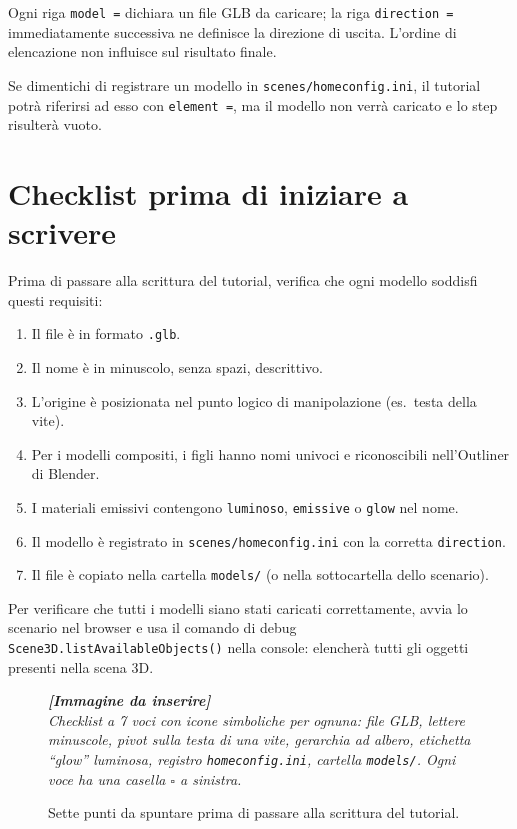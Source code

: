 ﻿\documentclass[a4paper,12pt,oneside]{book}
\newcommand{\kw}[1]{\texttt{\color{keycolor}#1}}
\newcommand{\file}[1]{\texttt{#1}}
\newcommand{\imgph}[2]{%
  \begin{tcolorbox}[colback=cvtlightblue!30,colframe=cvtblue!40,%
    width=#1,halign=center,valign=center,height=5cm,boxrule=0.5pt,arc=3pt]%
    \textcolor{cvtgray}{\itshape\footnotesize\textbf{[Immagine da inserire]}\\[3pt]#2}%
  \end{tcolorbox}}
\begin{document}
Ogni riga \texttt{model =} dichiara un file GLB da caricare; la riga
\texttt{direction =} immediatamente successiva ne definisce la direzione
di uscita. L'ordine di elencazione non influisce sul risultato finale.

\begin{attenzione}
Se dimentichi di registrare un modello in \file{scenes/homeconfig.ini},
il tutorial potrà riferirsi ad esso con \kw{element =}, ma il modello
non verrà caricato e lo step risulterà vuoto.
\end{attenzione}

\section{Checklist prima di iniziare a scrivere}

Prima di passare alla scrittura del tutorial, verifica che ogni modello
soddisfi questi requisiti:

\begin{enumerate}
  \item[$\square$] Il file è in formato \file{.glb}.
  \item[$\square$] Il nome è in minuscolo, senza spazi, descrittivo.
  \item[$\square$] L'origine è posizionata nel punto logico di
        manipolazione (es.\ testa della vite).
  \item[$\square$] Per i modelli compositi, i figli hanno nomi univoci e
        riconoscibili nell'Outliner di Blender.
  \item[$\square$] I materiali emissivi contengono \texttt{luminoso},
        \texttt{emissive} o \texttt{glow} nel nome.
  \item[$\square$] Il modello è registrato in \file{scenes/homeconfig.ini}
        con la corretta \texttt{direction}.
  \item[$\square$] Il file è copiato nella cartella \file{models/}
        (o nella sottocartella dello scenario).
\end{enumerate}

\begin{trucchetto}
Per verificare che tutti i modelli siano stati caricati correttamente,
avvia lo scenario nel browser e usa il comando di debug
\texttt{Scene3D.listAvailableObjects()} nella console: elencherà tutti
gli oggetti presenti nella scena 3D.
\end{trucchetto}

\begin{figure}[H]
  \centering
  \imgph{12cm}{Checklist a 7 voci con icone simboliche per ognuna: file GLB, lettere minuscole, pivot sulla testa di una vite, gerarchia ad albero, etichetta ``glow'' luminosa, registro \file{homeconfig.ini}, cartella \file{models/}. Ogni voce ha una casella $\square$ a sinistra.}
  \caption{Sette punti da spuntare prima di passare alla scrittura del tutorial.}
  \label{fig:checklist-modelli}
\end{figure}
\end{document}
